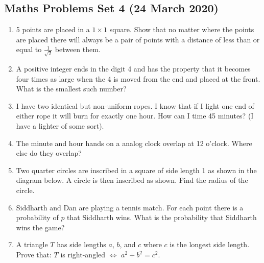 \documentclass{article}
\begin{document}
\begin{center}
        \section*{Maths Problems Set 4 (24 March 2020)}
\end{center}

\begin{enumerate}
    \item
    5 points are placed in a $1\times1$ square. Show that no matter where the points are placed there will always be a pair of points with a distance of less than or equal to $\frac{1}{\sqrt{2}}$ between them.

    
    \item
    A positive integer ends in the digit 4 and has the property that it becomes four times as large when the 4 is moved from the end and placed at the front. What is the smallest such number?
    
    \item
    I have two identical but non-uniform ropes. I know that if I light one end of either rope it will burn for exactly one hour. How can I time 45 minutes? (I have a lighter of some sort).
    
    \item
    The minute and hour hands on a analog clock overlap at 12 o’clock. Where else do they overlap?
    
    \item
    Two quarter circles are inscribed in a square of side length 1 as shown in the diagram below. A circle is then inscribed as shown. Find the radius of the circle.
    
    
    \item
    Siddharth and Dan are playing a tennis match. For each point there is a probability of $p$ that Siddharth wins. What is the probability that Siddharth wins the game?    
    
    \item
    A triangle $T$ has side lengths $a$, $b$, and $c$ where $c$ is the longest side length. Prove that: $T$ is right-angled $\iff$ $a^2 + b^2 = c^2$.
    

\end{enumerate}
\end{document}
